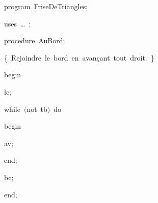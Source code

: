 
{
\parindent {}
\medskip

\carrenoir
\vspace{\neglskip}\mbox{\blc  \idt  \mcl program\idt \ FriseDeTriangles$;$
}\par 
\vspace{\neglskip}\mbox{\blc \blk\idt \mcl uses\idt \ \ldots\ $;$
}\par 
\medskip

\pagebreak[3] 
\vspace{\neglskip}\mbox{\blc  \blk\idt  \mcl procedure\idt \ AuBord$;$}\par 
\vspace{\neglskip}\mbox{\blc  \blk\blk\idt  \cmt  \{\ Rejoindre\ le\ bord\ en\ avançant\ tout\ droit.\ \}\idt }\par 
\vspace{\neglskip}\mbox{\blc  \blk\idt  \mcl begin\idt }\par 
\vspace{\neglskip}\mbox{\blc  \blk\blk\idt  lc$;$\ }\par 
\pagebreak[3] 
\vspace{\neglskip}\mbox{\blc  \blk\blk\idt  \mcl while\idt \ $($\mcl not\idt \ tb$)$\ \mcl do\idt }\par 
\vspace{\neglskip}\mbox{\blc  \blk\blk\blk\idt  \mcl begin\idt }\par 
\vspace{\neglskip}\mbox{\blc  \blk\blk\blk\blk\idt  av$;$}\par 
\vspace{\neglskip}\mbox{\blc  \blk\blk\blk\idt  \mcl end\idt $;$}\par 
\vspace{\neglskip}\mbox{\blc  \blk\blk\idt  bc$;$\ }\par 
\vspace{\neglskip}\mbox{\blc  \blk\idt  \mcl end\idt $;$}\par 
\medskip

}
